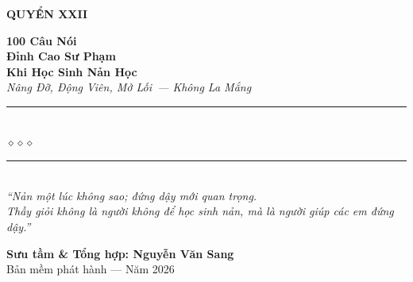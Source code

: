 \begin{titlepage}
\begin{center}
  \begin{tcolorbox}[
    width=6.5cm,
    colback=amber!20,
    colframe=amber!80!black,
    arc=4pt,
    boxrule=1.5pt,
    halign=center
  ]
    {\fontsize{18}{22}\selectfont\bfseries\color{inkdark!80!black}
     QUYỂN XXII}
  \end{tcolorbox}
  \vspace{0.8cm}

  {\fontsize{28}{34}\selectfont\bfseries\color{inkdark!80!black}
    100 Câu Nói}\\[0.4cm]
  {\fontsize{28}{34}\selectfont\bfseries\color{amber!80!black}
    Đỉnh Cao Sư Phạm}\\[0.4cm]
  {\fontsize{28}{34}\selectfont\bfseries\color{inkdark!80!black}
    Khi Học Sinh Nản Học}\\[0.4cm]

  {\fontsize{16}{20}\selectfont\color{amber!90!black}\itshape
    Nâng Đỡ, Động Viên, Mở Lối~--- Không La Mắng}\\[1cm]

  {\color{deepviolet!60}\rule{6cm}{1pt}}\\[5pt]
  {\color{amber!80!black}\large$\diamond$\hspace{1cm}$\diamond$\hspace{1cm}$\diamond$}\\[5pt]
  {\color{deepviolet!60}\rule{6cm}{1pt}}\\[1.5cm]

  {\normalsize\itshape\color{deepviolet!90!black}
   ``Nản một lúc không sao; đứng dậy mới quan trọng.\\
   Thầy giỏi không là người không để học sinh nản, mà là người giúp các em đứng dậy.''}

  \vfill

  {\fontsize{16}{20}\selectfont\bfseries\color{deepviolet!90!black}
    Sưu tầm \& Tổng hợp: \textbf{Nguyễn Văn Sang}}\\[0.4cm]

  {\small\color{gray} Bản mềm phát hành --- Năm 2026}\\[0.5cm]
\end{center}

\afterpage{\nopagecolor}
\end{titlepage}